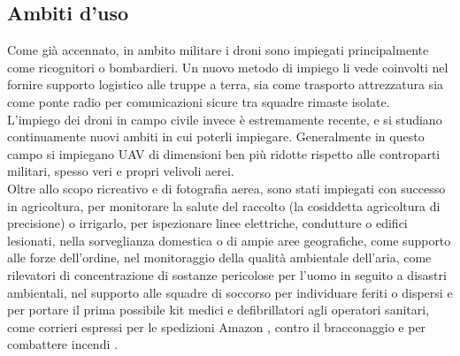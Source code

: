 \subsection[Ambiti d'uso]{Ambiti d'uso}
Come già accennato, in ambito militare i droni sono impiegati principalmente come ricognitori o bombardieri. 
Un nuovo metodo di impiego li vede coinvolti nel fornire supporto logistico alle truppe a terra, sia come trasporto attrezzatura sia come ponte radio per comunicazioni sicure tra squadre rimaste isolate. \\
L'impiego dei droni in campo civile invece è estremamente recente, e si studiano continuamente nuovi ambiti in cui poterli impiegare. 
Generalmente in questo campo si impiegano UAV di dimensioni ben più ridotte rispetto alle controparti militari, spesso veri e propri velivoli aerei. \\
Oltre allo scopo ricreativo e di fotografia aerea, sono stati impiegati con successo in agricoltura, per monitorare la salute del raccolto (la cosiddetta agricoltura di precisione) o irrigarlo, per ispezionare linee elettriche, condutture o edifici lesionati, nella sorveglianza domestica o di ampie aree geografiche, come supporto alle forze dell'ordine, nel monitoraggio della qualità ambientale dell'aria, come rilevatori di concentrazione di sostanze pericolose per l'uomo in seguito a disastri ambientali, nel supporto alle squadre di soccorso per individuare feriti o dispersi e per portare il prima possibile kit medici e defibrillatori agli operatori sanitari, come corrieri espressi per le spedizioni Amazon \cite{amazon}, contro il bracconaggio e per combattere incendi \cite{dronespeak}. 


